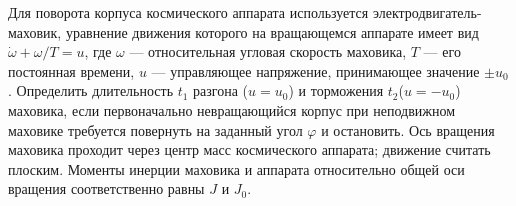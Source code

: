 Для поворота корпуса космического аппарата используется
электродвигатель-маховик, уравнение движения которого на вращающемся аппарате
имеет вид $\dot{\omega} + \omega / T = u$, где $\omega$ --- относительная
угловая скорость маховика, $T$ --- его постоянная времени, $u$ --- управляющее
напряжение, принимающее значение $\pm u_0$.
Определить длительность $t_1$ разгона ($u = u_0$)
и торможения $t_2$($u = -u_0$) маховика, если первоначально невращающийся
корпус при неподвижном маховике требуется повернуть
на заданный угол $\varphi$ и остановить.
Ось вращения маховика проходит через центр масс космического аппарата;
движение считать плоским.
Моменты инерции маховика и аппарата относительно общей оси вращения
соответственно равны $J$ и $J_0$.
